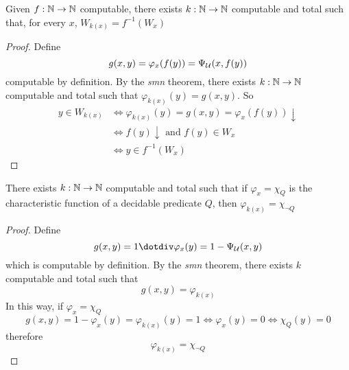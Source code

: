 \begin{proposition}
  Given $f : \mathbb{N} \to \mathbb{N}$ computable, there exists $k : \mathbb{N} \to \mathbb{N}$
computable and total such that, for every $x$, $W_{k(x)} = f^{-1}(W_x)$
\begin{proof}
  Define
  \[g(x,y) = \varphi_x(f(y)) = \Psi_{\mathcal{U}}(x, f(y))\] computable by
  definition. By the \emph{smn} theorem, there exists $k: \mathbb{N} \to \mathbb{N}$ computable
  and total such that \(\varphi_{k(x)}(y) = g(x,y)\). So
  \[
    \begin{split}
      y \in W_{k(x)} & \Leftrightarrow \varphi_{k(x)}(y) = g(x,y) = \varphi_x(f(y)) \downarrow \\
      & \Leftrightarrow f(y)\downarrow \mbox{ and } f(y) \in W_x \\
      & \Leftrightarrow y \in f^{-1}(W_x)
    \end{split}
  \]
\end{proof}
\end{proposition}

\begin{proposition}
There exists $k : \mathbb{N} \to \mathbb{N}$ computable and total such that if
$\varphi_x = \chi_Q$ is the characteristic function of a decidable
predicate $Q$, then $\varphi_{k(x)} = \chi_{\neg Q}$
\begin{proof}
  Define \[g(x,y) = 1 \dotdiv \varphi_x(y) = 1 - \univ(x,y) \]
  which is computable by definition. By the \emph{smn} theorem, there exists
  $k$ computable and total such that \[g(x,y) = \varphi_{k(x)}\]
  In this way,
  if $\varphi_x = \chi_Q$
  \[
    g(x,y) = 1-\varphi_x(y) = \varphi_{k(x)}(y) = 1 \Leftrightarrow
    \varphi_x(y) = 0 \Leftrightarrow \chi_Q(y) = 0
  \]
  therefore
  \[
    \varphi_{k(x)} = \chi_{\neg Q}
  \]
\end{proof}
\end{proposition}


